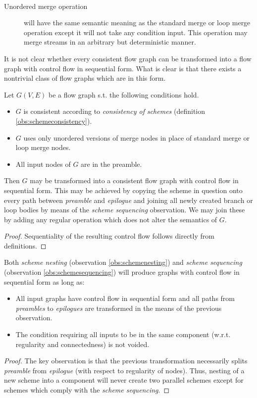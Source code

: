  \ 
\begin{description}
  \item [Unordered merge operation] will have the same semantic meaning as the standard merge or loop merge operation except it will not take any condition input. This operation may merge streams in an arbitrary but deterministic manner.
\end{description}
\myenddef

It is not clear whether every consistent flow graph can be transformed into a flow graph with control flow in sequential form. What is clear is that there exists a nontrivial class of flow graphs which are in this form.

  Let $G(V,E)$ be a flow graph s.t. the following conditions hold.
  \begin{itemize}
    \item $G$ is consistent according to \emph{consistency of schemes} (definition \ref{obs:schemeconsistency}).
    \item $G$ uses only unordered versions of merge nodes in place of standard merge or loop merge nodes.
    \item All input nodes of $G$ are in the preamble.
  \end {itemize} 
  Then $G$ may be transformed into a consistent flow graph with control flow in sequential form. This may be achieved by copying the scheme in question onto every path between \emph{preamble} and \emph{epilogue} and joining all newly created branch or loop bodies by means of the \emph{scheme sequencing} observation. We may join these by adding any regular operation which does not alter the semantics of $G$.
  \begin{proof} 
  Sequentiality of the resulting control flow follows directly from definitions.
  \end{proof}
\myendobs

      Both \emph{scheme nesting} (observation \ref{obs:schemenesting}) and \emph{scheme sequencing} (observation \ref{obs:schemesequencing}) will produce graphs with control flow in sequential form as long as:
  \begin{itemize}
    \item All input graphs have control flow in sequential form and all paths from \emph{preambles} to \emph{epilogues} are transformed in the means of the previous observation.
    \item The condition requiring all inputs to be in the same component (w.r.t. regularity and connectedness) is not voided.
  \end {itemize} 
  \begin{proof} 
  The key observation is that the previous transformation necessarily splits \emph{preamble} from \emph{epilogue} (with respect to regularity of nodes). Thus, nesting of a new scheme into a component will never create two parallel schemes except for schemes which comply with the \emph{scheme sequencing}.
  \end{proof}
\myendobs

